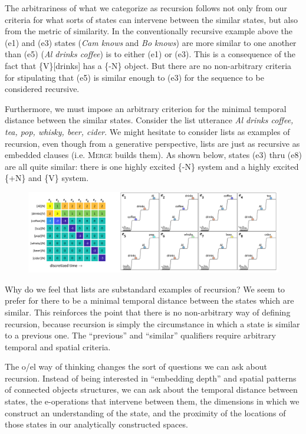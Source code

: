   The arbitrariness of what we categorize as recursion follows not only from our criteria for what sorts of states can intervene between the similar states, but also from the metric of similarity. In the conventionally recursive example above the (e1) and (e3) states (\textit{Cam knows} and \textit{Bo knows}) are more similar to one another than (e5) (\textit{Al drinks coffee}) is to either (e1) or (e3). This is a consequence of the fact that \{V\}[drinks] has a \{-N\} object. But there are no non-arbitrary criteria for stipulating that (e5) is similar enough to (e3) for the sequence to be considered recursive.

  Furthermore, we must impose an arbitrary criterion for the minimal temporal distance between the similar states. Consider the list utterance \textit{Al drinks coffee, tea, pop, whisky, beer, cider}. We might hesitate to consider lists as examples of recursion, even though from a generative perspective, lists are just as recursive as embedded clauses (i.e. \textsc{Merge} builds them). As shown below, states (e3) thru (e8) are all quite similar: there is one highly excited \{-N\} system and a highly excited \{+N\} and \{V\} system.

  
\begin{figure}
\includegraphics[width=\textwidth]{figures/Tilsen-img114.png}
\caption{\missingcaption}
\label{fig:5:10}
\end{figure}
 

  Why do we feel that lists are substandard examples of recursion? We seem to prefer for there to be a minimal temporal distance between the states which are similar. This reinforces the point that there is no non-arbitrary way of defining recursion, because recursion is simply the circumstance in which a state is similar to a previous one. The “previous” and “similar” qualifiers require arbitrary temporal and spatial criteria. 

  The o/el way of thinking changes the sort of questions we can ask about recursion. Instead of being interested in “embedding depth” and spatial patterns of connected objects structures, we can ask about the temporal distance between states, the e-operations that intervene between them, the dimensions in which we construct an understanding of the state, and the proximity of the locations of those states in our analytically constructed spaces.

